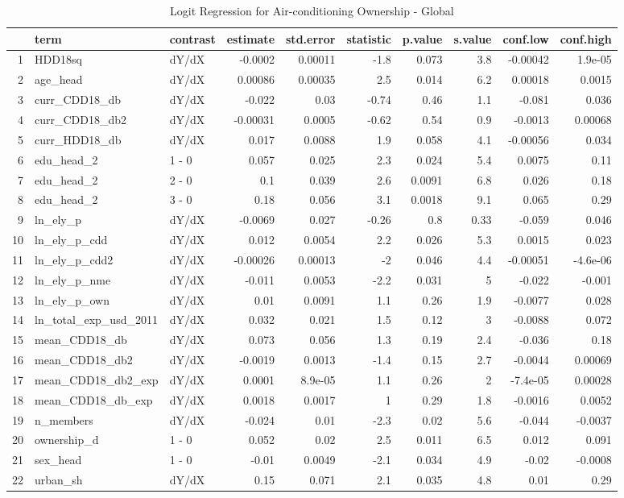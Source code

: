 \begin{table}[htbp]
\centering
\caption{Logit Regression for Air-conditioning Ownership - Global} 
\begin{tabular}{rllrrrrrrr}
  \hline
 & term & contrast & estimate & std.error & statistic & p.value & s.value & conf.low & conf.high \\ 
  \hline
1 & HDD18sq & dY/dX & -0.0002 & 0.00011 & -1.8 & 0.073 & 3.8 & -0.00042 & 1.9e-05 \\ 
  2 & age\_head & dY/dX & 0.00086 & 0.00035 & 2.5 & 0.014 & 6.2 & 0.00018 & 0.0015 \\ 
  3 & curr\_CDD18\_db & dY/dX & -0.022 & 0.03 & -0.74 & 0.46 & 1.1 & -0.081 & 0.036 \\ 
  4 & curr\_CDD18\_db2 & dY/dX & -0.00031 & 0.0005 & -0.62 & 0.54 & 0.9 & -0.0013 & 0.00068 \\ 
  5 & curr\_HDD18\_db & dY/dX & 0.017 & 0.0088 & 1.9 & 0.058 & 4.1 & -0.00056 & 0.034 \\ 
  6 & edu\_head\_2 & 1 - 0 & 0.057 & 0.025 & 2.3 & 0.024 & 5.4 & 0.0075 & 0.11 \\ 
  7 & edu\_head\_2 & 2 - 0 & 0.1 & 0.039 & 2.6 & 0.0091 & 6.8 & 0.026 & 0.18 \\ 
  8 & edu\_head\_2 & 3 - 0 & 0.18 & 0.056 & 3.1 & 0.0018 & 9.1 & 0.065 & 0.29 \\ 
  9 & ln\_ely\_p & dY/dX & -0.0069 & 0.027 & -0.26 & 0.8 & 0.33 & -0.059 & 0.046 \\ 
  10 & ln\_ely\_p\_cdd & dY/dX & 0.012 & 0.0054 & 2.2 & 0.026 & 5.3 & 0.0015 & 0.023 \\ 
  11 & ln\_ely\_p\_cdd2 & dY/dX & -0.00026 & 0.00013 &  -2 & 0.046 & 4.4 & -0.00051 & -4.6e-06 \\ 
  12 & ln\_ely\_p\_nme & dY/dX & -0.011 & 0.0053 & -2.2 & 0.031 &   5 & -0.022 & -0.001 \\ 
  13 & ln\_ely\_p\_own & dY/dX & 0.01 & 0.0091 & 1.1 & 0.26 & 1.9 & -0.0077 & 0.028 \\ 
  14 & ln\_total\_exp\_usd\_2011 & dY/dX & 0.032 & 0.021 & 1.5 & 0.12 &   3 & -0.0088 & 0.072 \\ 
  15 & mean\_CDD18\_db & dY/dX & 0.073 & 0.056 & 1.3 & 0.19 & 2.4 & -0.036 & 0.18 \\ 
  16 & mean\_CDD18\_db2 & dY/dX & -0.0019 & 0.0013 & -1.4 & 0.15 & 2.7 & -0.0044 & 0.00069 \\ 
  17 & mean\_CDD18\_db2\_exp & dY/dX & 0.0001 & 8.9e-05 & 1.1 & 0.26 &   2 & -7.4e-05 & 0.00028 \\ 
  18 & mean\_CDD18\_db\_exp & dY/dX & 0.0018 & 0.0017 &   1 & 0.29 & 1.8 & -0.0016 & 0.0052 \\ 
  19 & n\_members & dY/dX & -0.024 & 0.01 & -2.3 & 0.02 & 5.6 & -0.044 & -0.0037 \\ 
  20 & ownership\_d & 1 - 0 & 0.052 & 0.02 & 2.5 & 0.011 & 6.5 & 0.012 & 0.091 \\ 
  21 & sex\_head & 1 - 0 & -0.01 & 0.0049 & -2.1 & 0.034 & 4.9 & -0.02 & -0.0008 \\ 
  22 & urban\_sh & dY/dX & 0.15 & 0.071 & 2.1 & 0.035 & 4.8 & 0.01 & 0.29 \\ 
   \hline
\end{tabular}
\end{table}
